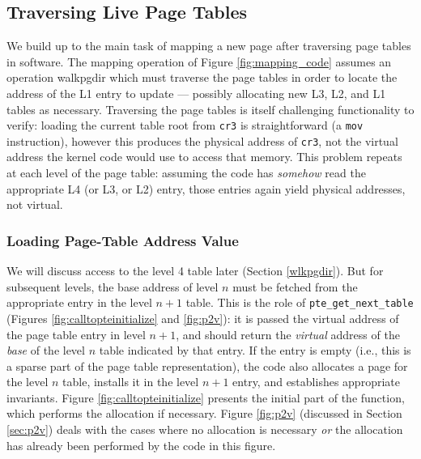 \subsection{Traversing Live Page Tables}
\label{sec:traversing}
We build up to the main task of mapping a new page after traversing page tables in software.
The mapping operation of Figure \ref{fig:mapping_code} assumes an operation \textsf{walkpgdir} which must traverse the page tables
in order to locate the address of the L1 entry to update --- 
possibly allocating new L3, L2, and L1 tables as necessary.
Traversing the page tables is itself challenging functionality to verify: loading the current table root from \lstinline|cr3| is straightforward
(a \lstinline|mov| instruction), however this produces the physical address of \lstinline|cr3|, not the virtual address the kernel code would use to access that memory.
This problem repeats at each level of the page table: assuming the code has \emph{somehow} read the appropriate L4 (or L3, or L2) entry, those entries again
yield physical addresses, not virtual.

\subsubsection{Loading Page-Table Address Value}
We will discuss access to the level 4 table later (Section \ref{wlkpgdir}). But for subsequent levels, the base address of level $n$ must be
fetched from the appropriate entry in the level $n+1$ table.
This is the role of \lstinline|pte_get_next_table| (Figures \ref{fig:calltopteinitialize} and \ref{fig:p2v}):
it is passed the virtual address of the page table entry in level $n+1$, and should return the \emph{virtual} 
address of the \emph{base} of the level $n$ table
indicated by that entry.
If the entry is empty (i.e., this is a sparse part of the page table representation),
the code also allocates a page for the level $n$ table, installs it in the level $n+1$ entry, and establishes appropriate invariants.
Figure \ref{fig:calltopteinitialize} presents the initial part of the function, which performs the allocation if necessary.
Figure \ref{fig:p2v} (discussed in Section \ref{sec:p2v}) deals with the cases where no allocation is necessary \emph{or} the allocation has already
been performed by the code in this figure.

